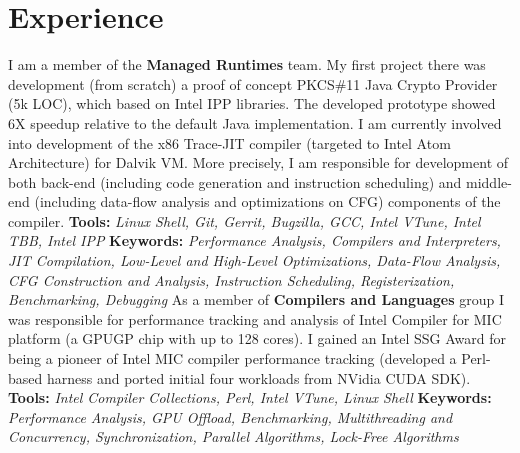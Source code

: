 \documentclass[11pt,a4paper]{moderncv-xetex}
\begin{document}
\section{Experience}
    {I am a member of the \textbf{Managed Runtimes} team. My first project there was development (from scratch) a proof of concept
    PKCS\#11 Java Crypto Provider (5k LOC), which based on Intel IPP libraries. The developed prototype showed 6X speedup relative
    to the default Java implementation.\newline
    I am currently involved into development of the x86 Trace-JIT compiler (targeted to Intel\textsuperscript{\textregistered} Atom\textsuperscript{\texttrademark} Architecture) for Dalvik VM.
    More precisely, I am responsible for development of both back-end (including code generation and instruction scheduling) and middle-end (including data-flow analysis and optimizations on CFG) components of the compiler.
    \newline
    \textbf{Tools:} \emph{Linux Shell, Git, Gerrit, Bugzilla, GCC, Intel VTune, Intel TBB, Intel IPP}\newline
    \textbf{Keywords:} \emph{Performance Analysis, Compilers and Interpreters, JIT Compilation, Low-Level and High-Level Optimizations, Data-Flow Analysis, CFG Construction and Analysis, Instruction Scheduling, Registerization, Benchmarking, Debugging}\newline
    }
    {As a member of \textbf{Compilers and Languages} group I was responsible for performance tracking and analysis of Intel Compiler
    for MIC platform (a GPUGP chip with up to 128 cores). I gained an Intel SSG Award for being a pioneer of Intel MIC compiler performance
    tracking (developed a Perl-based harness and ported initial four workloads from NVidia CUDA SDK).\newline
    \textbf{Tools:} \emph{Intel Compiler Collections, Perl, Intel VTune, Linux Shell}\newline
    \textbf{Keywords:} \emph{Performance Analysis, GPU Offload, Benchmarking, Multithreading and Concurrency, Synchronization, Parallel Algorithms, Lock-Free Algorithms}\newline
    }
\end{document}
